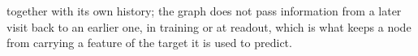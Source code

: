 together with its own history; the graph does not pass information from a later visit back to an earlier
one, in training or at readout, which is what keeps a node from carrying a feature of the target it is
used to predict.

